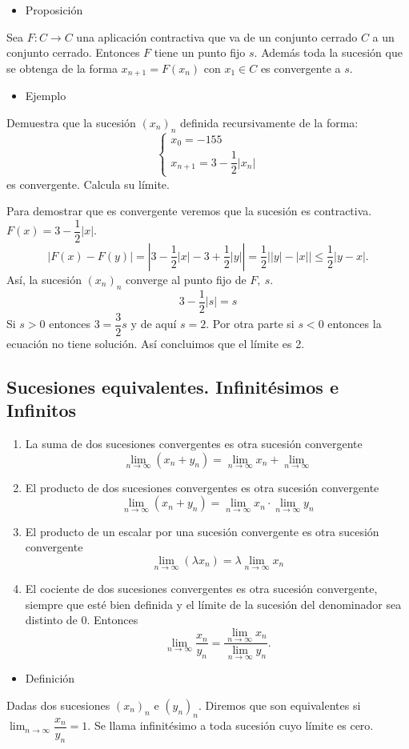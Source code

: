 \documentclass[12pt]{article}
\begin{document}
\begin{itemize}[label=\color{red}\textbullet, leftmargin=*]
	\item \color{lightblue} Proposición
\end{itemize} 
Sea $F:C\to C$ una aplicación contractiva que va de un conjunto cerrado $C$ a un conjunto cerrado. Entonces $F$ tiene un punto fijo $s$. Además toda la sucesión que se obtenga de la forma $x_{n+1}=F(x_n)$ con $x_1\in C$ es convergente a $s$.

\begin{itemize}[label=\color{red}\textbullet, leftmargin=*]
	\item \color{lightblue}Ejemplo
\end{itemize}
Demuestra que la sucesión $(x_n)_n$ definida recursivamente de la forma: \[ \left\{\begin{array}{l}
	x_0=-155\\
	x_{n+1}=3-\dfrac{1}{2}|x_n|
\end{array}\right.\] es convergente. Calcula su límite.

Para demostrar que es convergente veremos que la sucesión es contractiva. $F(x)=3-\dfrac{1}{2}|x|$. \[ |F(x)-F(y)|=\left|3-\dfrac{1}{2}|x|-3+\dfrac{1}{2}|y|\right| =\dfrac{1}{2}\left||y|-|x|\right|\le\dfrac{1}{2}|y-x|.\]
Así, la sucesión $(x_n)_n$ converge al punto fijo de $F,~s$. \[ 3-\dfrac{1}{2}|s|=s \]
Si $s>0$ entonces $3=\dfrac{3}{2}s$ y de aquí $s=2$. Por otra parte si $s<0$ entonces la ecuación no tiene solución. Así concluimos que el límite es 2.
\subsection{Sucesiones equivalentes. Infinitésimos e Infinitos}
\begin{enumerate}[label=\arabic*)]
	\item La suma de dos sucesiones convergentes es otra sucesión convergente \[ \lim_{n\to\infty}(x_n+y_n)=\lim_{n\to\infty}x_n+\lim_{n\to\infty} \]
	\item El producto de dos sucesiones convergentes es otra sucesión convergente \[ \lim_{n\to\infty}(x_n+y_n)=\lim_{n\to\infty}x_n\cdot\lim_{n\to\infty}y_n \]
	\item El producto de un escalar por una sucesión convergente es otra sucesión convergente \[ \lim_{n\to\infty}(\lambda x_n)=\lambda\lim_{n\to\infty}x_n \]
	\item El cociente de dos sucesiones convergentes es otra sucesión convergente, siempre que esté bien definida y el límite de la sucesión del denominador sea distinto de 0. Entonces \[ \lim_{n\to\infty}\dfrac{x_n}{y_n}=\dfrac{\displaystyle\lim_{n\to\infty}x_n}{\displaystyle\lim_{n\to\infty}y_n} .\]
\end{enumerate}
\begin{itemize}[label=\color{red}\textbullet, leftmargin=*]
	\item \color{lightblue}Definición
\end{itemize}
Dadas dos sucesiones $(x_n)_n$ e $(y_n)_n$. Diremos que son equivalentes si $\lim_{n\to\infty}\dfrac{x_n}{y_n}=1$. Se llama infinitésimo a toda sucesión cuyo límite es cero.
\end{document}
